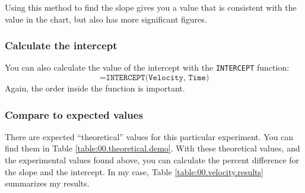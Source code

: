 Using this method to find the slope gives you a value that is consistent with the value in the chart, but also has more significant figures.
%
\subsubsection{Calculate the intercept}
%
You can also calculate the value of the intercept with the \texttt{INTERCEPT} function:
\begin{equation}
    \texttt{=INTERCEPT(Velocity, Time)}
\end{equation}
Again, the order inside the function is important.
%
\subsubsection{Compare to expected values}
%
There are expected ``theoretical'' values for this particular experiment. You can find them in Table \ref{table:00.theoretical.demo}. With these theoretical values, and the experimental values found above, you can calculate the percent difference for the slope and the intercept. In my case, Table \ref{table:00.velocity.results} summarizes my results.
%
\begin{center}
\end{center}
%
